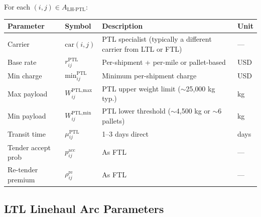 \documentclass[11pt,a4paper]{article}
\theoremstyle{definition}
\begin{document}
For each $(i,j) \in A_{\text{LH-PTL}}$:
\begin{center}
\begin{tabular}{llp{6cm}l}
\toprule
Parameter & Symbol & Description & Unit \\
\midrule
Carrier & $\text{car}(i,j)$ & PTL specialist (typically a different carrier from LTL or FTL) & — \\
Base rate & $r_{ij}^{\text{PTL}}$ & Per-shipment + per-mile or pallet-based & USD \\
Min charge & $\text{min}_{ij}^{\text{PTL}}$ & Minimum per-shipment charge & USD \\
Max payload & $W^{\text{PTL,max}}_{ij}$ & PTL upper weight limit ($\sim$25{,}000 kg typ.) & kg \\
Min payload & $W^{\text{PTL,min}}_{ij}$ & PTL lower threshold ($\sim$4{,}500 kg or $\sim$6 pallets) & kg \\
Transit time & $\mu_{ij}^{\text{PTL}}$ & 1--3 days direct & days \\
Tender accept prob & $p_{ij}^{\text{acc}}$ & As FTL & — \\
Re-tender premium & $\rho_{ij}^{\text{re}}$ & As FTL & — \\
\bottomrule
\end{tabular}
\end{center}

\subsection{LTL Linehaul Arc Parameters}
\label{sec:ltl-params}
\end{document}
